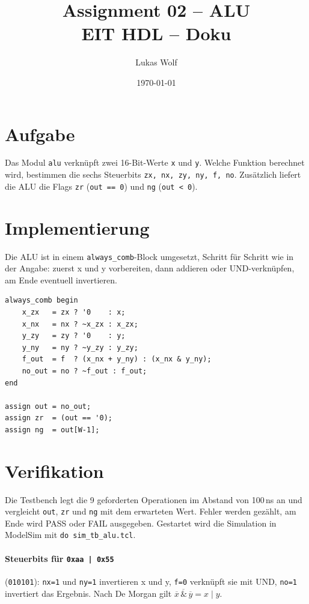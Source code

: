 \documentclass[11pt,a4paper]{article}
\title{Assignment 02 -- ALU\\\large EIT HDL -- Doku}
\author{Lukas Wolf}
\date{\today}
\begin{document}
\maketitle

\section{Aufgabe}
Das Modul \texttt{alu} verknüpft zwei 16-Bit-Werte \texttt{x} und \texttt{y}. Welche Funktion
berechnet wird, bestimmen die sechs Steuerbits \texttt{zx, nx, zy, ny, f, no}. Zusätzlich
liefert die ALU die Flags \texttt{zr} (\texttt{out == 0}) und \texttt{ng} (\texttt{out < 0}).

\section{Implementierung}
Die ALU ist in einem \texttt{always\_comb}-Block umgesetzt, Schritt für Schritt wie in der
Angabe: zuerst x und y vorbereiten, dann addieren oder UND-verknüpfen, am Ende eventuell
invertieren.

\begin{lstlisting}[language=SV]
always_comb begin
    x_zx   = zx ? '0    : x;
    x_nx   = nx ? ~x_zx : x_zx;
    y_zy   = zy ? '0    : y;
    y_ny   = ny ? ~y_zy : y_zy;
    f_out  = f  ? (x_nx + y_ny) : (x_nx & y_ny);
    no_out = no ? ~f_out : f_out;
end

assign out = no_out;
assign zr  = (out == '0);
assign ng  = out[W-1];
\end{lstlisting}

\section{Verifikation}
Die Testbench legt die 9 geforderten Operationen im Abstand von 100\,ns an und vergleicht
\texttt{out}, \texttt{zr} und \texttt{ng} mit dem erwarteten Wert. Fehler werden gezählt,
am Ende wird PASS oder FAIL ausgegeben. Gestartet wird die Simulation in ModelSim mit
\texttt{do sim\_tb\_alu.tcl}.

\paragraph{Steuerbits für \texttt{0xaa | 0x55}} (\texttt{010101}): \texttt{nx=1} und
\texttt{ny=1} invertieren x und y, \texttt{f=0} verknüpft sie mit UND, \texttt{no=1}
invertiert das Ergebnis. Nach De Morgan gilt $\overline{\overline{x} \,\&\, \overline{y}} = x \mid y$.
\end{document}
